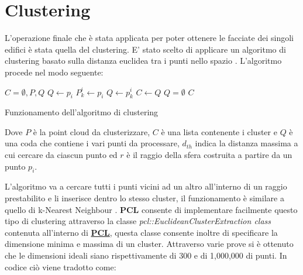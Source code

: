 \section{Clustering}

L'operazione finale che è stata applicata per poter ottenere le facciate dei singoli edifici è stata quella del clustering. \newline
E' stato scelto di applicare un algoritmo di clustering basato sulla distanza euclidea tra i punti nello spazio \cite{RusuDoctoralDissertation}.
L'algoritmo procede nel modo seguente:

\begin{algorithm}[H]
\begin{algorithmic}{}
    \State $C = \emptyset, P, Q$
        \State $Q \leftarrow p_i$
                \State $P^i_k \leftarrow p_i$
            \EndFor
                    \State $Q \leftarrow p^i_k$
                \EndIf
            \EndFor
        \EndFor
        \State $C \leftarrow Q$
        \State $Q = \emptyset$
    \EndFor
    \State \Return $C$
\end{algorithmic}
 \caption{Funzionamento dell'algoritmo di clustering}
 \label{alg:Clustering}
\end{algorithm}

Dove $P$ è la point cloud da clusterizzare, $C$ è una lista contenente i cluster e $Q$ è una coda che contiene i vari punti da processare, $d_{th}$ indica la distanza massima a cui cercare da ciascun punto ed $r$ è il raggio della sfera costruita a partire da un punto $p_i$.

L'algoritmo va a cercare tutti i punti vicini ad un altro all'interno di un raggio prestabilito e li inserisce dentro lo stesso cluster, il funzionamento è similare a quello di k-Nearest Neighbour \cite{knn}.
\textbf{PCL} consente di implementare facilmente questo tipo di clustering attraverso la classe \textit{pcl::EuclideanClusterExtraction class} contenuta all'interno di \hyperref[sez:PCL]{\textbf{PCL}}, questa classe consente inoltre di specificare la dimensione minima e massima di un cluster. Attraverso varie prove si è ottenuto che le dimensioni ideali siano rispettivamente di 300 e di 1,000,000 di punti.
In codice ciò viene tradotto come:

